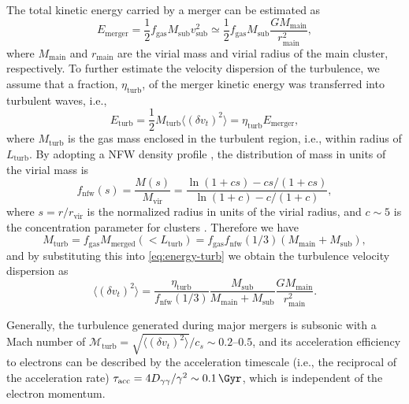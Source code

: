 \documentclass[modern]{aastex62}
\newcommand{\R}[1]{\mathrm{#1}}
\begin{document}
The total kinetic energy carried by a merger can be estimated as
\begin{equation}
  \label{eq:energy-merger}
  E_{\R{merger}} = \frac{1}{2} f_{\R{gas}} M_{\R{sub}} v^2_{\R{sub}}
    \simeq \frac{1}{2} f_{\R{gas}} M_{\R{sub}} \frac{G M_{\R{main}}}{r^2_{\R{main}}},
\end{equation}
where $M_{\R{main}}$ and $r_{\R{main}}$ are the virial mass and virial
radius of the main cluster, respectively.
To further estimate the velocity dispersion of the turbulence, we assume
that a fraction, $\eta_{\R{turb}}$, of the merger kinetic energy was
transferred into turbulent waves, i.e.,
\begin{equation}
  \label{eq:energy-turb}
  E_{\R{turb}} = \frac{1}{2} M_{\R{turb}} \langle (\delta{v_t})^2 \rangle
    = \eta_{\R{turb}} E_{\R{merger}},
\end{equation}
where
$M_{\R{turb}}$ is the gas mass enclosed in the turbulent region, i.e.,
within radius of $L_{\R{turb}}$.
By adopting a NFW density profile \citep{navarro1997}, the distribution
of mass in units of the virial mass is
\begin{equation}
  \label{eq:mass-dist-nfw}
  f_{\R{nfw}}(s) = \frac{M(s)}{M_{\R{vir}}} =
    \frac{\ln(1 + c s) - c s / (1 + c s)}{\ln(1 + c) - c / (1 + c)},
\end{equation}
where $s = r / r_{\R{vir}}$ is the normalized radius in units of the
virial radius, and $c \sim 5$ is the concentration parameter for
clusters \citep{lokas2001}.
Therefore we have
\begin{equation}
  \label{eq:mass-turb}
  M_{\R{turb}} = f_{\R{gas}} M_{\R{merged}}(<L_{\R{turb}})
    = f_{\R{gas}} f_{\R{nfw}}(1/3) (M_{\R{main}} + M_{\R{sub}}),
\end{equation}
and by substituting this into \autoref{eq:energy-turb} we obtain
the turbulence velocity dispersion as
\begin{equation}
  \label{eq:turb-velocity-dispersion}
  \langle (\delta{v_t})^2 \rangle =
    \frac{\eta_{\R{turb}}}{f_{\R{nfw}}(1/3)}
    \frac{M_{\R{sub}}}{M_{\R{main}} + M_{\R{sub}}}
    \frac{G M_{\R{main}}}{r^2_{\R{main}}}.
\end{equation}

Generally, the turbulence generated during major mergers is subsonic
with a Mach number of
$\mathcal{M}_{\R{turb}} = \sqrt{\langle (\delta{v_t})^2 \rangle} / c_s \sim \numrange{0.2}{0.5}$,
and its acceleration efficiency to electrons can be described by the
acceleration timescale (i.e., the reciprocal of the acceleration rate)
$\tau_{\R{acc}} = 4 D_{\gamma\gamma} / \gamma^2 \sim \SI{0.1}{\Gyr}$,
which is independent of the electron momentum.
\end{document}
